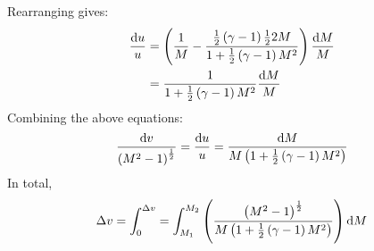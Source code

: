 \documentclass[class=report, crop=false, 12pt,a4paper]{standalone}
\begin{document}
Rearranging gives:
\begin{align}
    \frac{\dif u}{u} & = \left(\frac{1}{M} - \frac{\frac{1}{2}\left(\gamma -1 \right)\frac{1}{2}2M}{1 + \frac{1}{2}\left(\gamma - 1\right)M^2}\right)\frac{\dif M}{M} \\
                     & = \frac{1}{1 + \frac{1}{2}\left(\gamma - 1\right)M^2}\frac{\dif M}{M}
\end{align}
Combining the above equations:
\begin{equation}
    \frac{\dif v}{\left(M^2 - 1\right)^{\frac{1}{2}}} = \frac{\dif u}{u} = \frac{\dif M}{M\left(1 + \frac{1}{2}\left(\gamma -1\right)M^2\right)}
\end{equation}
In total,
\begin{equation}
    \Delta v = \int_0^{\Delta v} = \int_{M_1}^{M_2} \left(\frac{\left(M^2 - 1\right)^{\frac{1}{2}}}{M \left(1 + \frac{1}{2}\left(\gamma - 1\right)M^2\right)}\right)\dif M
\end{equation}
\end{document}
